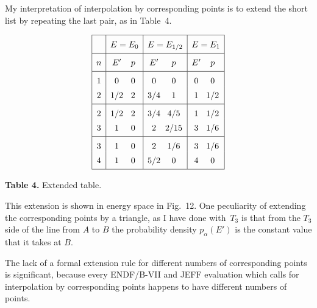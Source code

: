 \documentclass[11pt]{article}
\begin{document}
My interpretation of interpolation by corresponding points
is to extend the short list by repeating the last pair, as
in Table~4.

\begin{table}
$$
\vbox{
  \offinterlineskip
                                 \tabskip=0pt
  \halign{    %
    \vrule height 14pt depth 3pt #      \tabskip=5pt &
    \hfil #\hfil&                       %
    \vrule #&
    \hfil$#$\hfil  &               %
    \hfil$#$\hfil  &               %
    \vrule #&
    \hfil$#$\hfil  &               %
    \hfil$#$\hfil  &               %
    \vrule #&
    \hfil$#$\hfil  &               %
    \hfil$#$\hfil  &               %
    \vrule #              \tabskip=0pt  \cr  %
   \noalign{\hrule}
   depth 7pt &&& \multispan{2}\hfil$E = E_0$\hfil&&
        \multispan{2}\hfil$E = E_{1/2}$\hfil&&
        \multispan{2}\hfil$E = E_1$\hfil&\cr
   \noalign{\hrule}
   depth 7pt & $n$&& E' & p && E'& p && E'& p & \cr
   \noalign{\hrule}
    & 1&& 0 & 0&&  0 & 0&& 0 & 0& \cr  %
 depth 7pt    & 2&& 1/2 & 2&&  3/4 & 1&& 1 & 1/2& \cr  %
   \noalign{\hrule}
    & 2&& 1/2 & 2&&  3/4 & 4/5&& 1 & 1/2& \cr  %
 depth 7pt   & 3&& 1 & 0&&  2 & 2/15&& 3 & 1/6& \cr  %
   \noalign{\hrule}
    & 3&& 1 & 0&&  2 & 1/6&& 3 & 1/6& \cr  %
 depth 7pt   & 4&& 1 & 0&&  5/2 & 0&& 4 & 0& \cr  %
   \noalign{\hrule}
  }
}
$$
\vglue 10pt
\centerline{{\bf Table 4.}  Extended table.}
\end{table}

This extension is shown in energy space in Fig.~12.  One peculiarity
of extending the corresponding points by a triangle, as I have done
with~$T_3$ is that from the $T_3$ side of the line from $A$ to $B$
the probability density $p_\alpha(E')$ is the constant value that it
takes at $B$.

\begin{figure}

\end{figure}

The lack of a formal extension rule for different numbers of
corresponding points is significant, because every ENDF/B-VII
and JEFF evaluation which calls for interpolation by corresponding
points happens to have different numbers of points.
\end{document}
